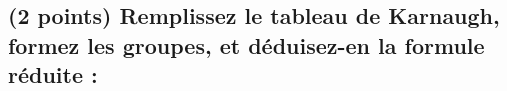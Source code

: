 \documentclass[11pt,a4paper]{article}
\begin{document}


\smallskip

\subsection{(2 points) Remplissez le tableau de Karnaugh, formez les groupes, et déduisez-en la formule réduite : }

\end{document}
